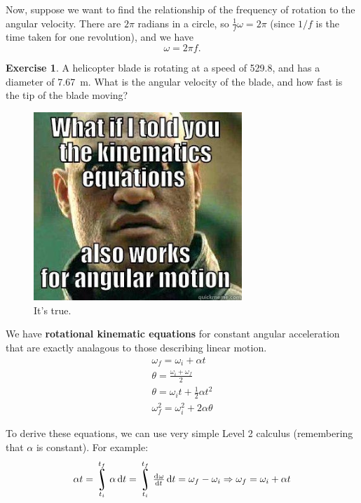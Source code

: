 \documentclass[a4paper]{amsbook}
\theoremstyle{definition}
\newtheorem{exercise}{Exercise}
\numberwithin{exercise}{chapter}
\numberwithin{exercise}{chapter}
\DeclareMathOperator*{\rint}{\scalerel*{\rotatebox{17}{$\!\int\!$}}{\int}}
\begin{document}
Now, suppose we want to find the relationship of the frequency of rotation to the angular velocity. There are $ 2\pi $ radians
in a circle, so $ \frac{1}{f} \omega = 2\pi $ (since $ 1/f $ is the time taken for one revolution), and we have
\begin{equation}
  \omega = 2\pi f.
\end{equation}

\begin{exercise}
  A helicopter blade is rotating at a speed of \SI{529.8}{\rpm}, and has a diameter of \SI{7.67}{\metre}. What is the angular
  velocity of the blade, and how fast is the tip of the blade moving?
\end{exercise}

\begin{figure}
  \centering
  \includegraphics[width=0.7\textwidth]{kinematics}
  \caption{It's true.\label{fig:kinematics}}
\end{figure}

We have \textbf{rotational kinematic equations} for constant angular acceleration that are exactly analagous to those describing linear motion.
\begin{gather}
  \omega_f = \omega_i + \alpha t\\
  \theta = \frac{\omega_i + \omega_f}{2}\\
  \theta = \omega_i t + \frac{1}{2} \alpha t^2\\
  \omega_f^2 = \omega_i^2 + 2 \alpha \theta
\end{gather}

To derive these equations, we can use very simple Level 2 calculus (remembering that $ \alpha $ is constant). For example:
\begin{gather*}
  \alpha t = \rint_{t_i}^{t_f} \alpha \dif{t} = \rint_{t_i}^{t_f} \od{\omega}{t} \dif{t} = \omega_f - \omega_i \Rightarrow \omega_f = \omega_i + \alpha t\\
\end{gather*}
\end{document}
